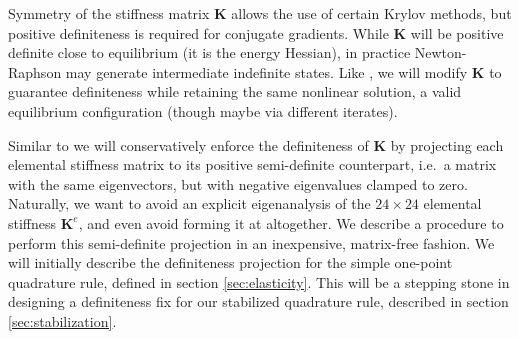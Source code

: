 Symmetry of the stiffness matrix $\mathbf{K}$ allows the use of certain Krylov
methods, but positive definiteness is required for conjugate gradients. While
$\mathbf{K}$ will be positive definite close to equilibrium (it is the energy
Hessian), in practice Newton-Raphson may generate intermediate
indefinite states. Like \cite{teran:2005:quasistatics}, we will modify
$\mathbf{K}$ to guarantee definiteness while retaining the same nonlinear
solution, a valid equilibrium configuration (though maybe via different iterates).



Similar to \cite{teran:2005:quasistatics} we will conservatively enforce the definiteness of $\mathbf{K}$ by projecting each elemental stiffness matrix to its positive semi-definite
counterpart, i.e.\ a matrix with the same eigenvectors, but with negative eigenvalues clamped to zero. Naturally, we want to avoid an explicit eigenanalysis of the $24\times 24$
elemental stiffness $\mathbf{K}^e$, and even avoid forming it at altogether. We describe a procedure to perform this semi-definite projection in an inexpensive, matrix-free fashion. We
will initially describe the definiteness projection for the simple one-point quadrature rule, defined in section \ref{sec:elasticity}. This will be a stepping stone in designing a
definiteness fix for our stabilized quadrature rule, described in
section \ref{sec:stabilization}. 

